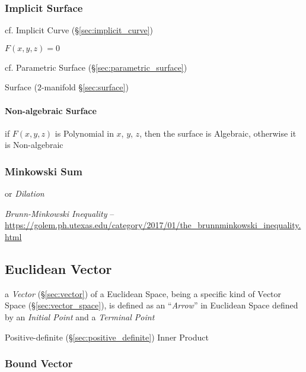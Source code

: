 \subsubsection{Implicit Surface}\label{sec:implicit_surface}

\fist cf. Implicit Curve (\S\ref{sec:implicit_curve})

$F(x,y,z) = 0$

\fist cf. Parametric Surface (\S\ref{sec:parametric_surface})

\fist Surface ($2$-manifold \S\ref{sec:surface})



\paragraph{Non-algebraic Surface}\label{sec:nonalgebraic_surface}\hfill

if $F(x,y,z)$ is Polynomial in $x$, $y$, $z$, then the surface is
Algebraic, otherwise it is Non-algebraic



\subsubsection{Minkowski Sum}\label{sec:minkowski_sum}

or \emph{Dilation}

\emph{Brunn-Minkowski Inequality} --
\url{https://golem.ph.utexas.edu/category/2017/01/the_brunnminkowski_inequality.html}



\subsection{Euclidean Vector}\label{sec:euclidean_vector}

a \emph{Vector} (\S\ref{sec:vector}) of a Euclidean Space, being a specific
kind of Vector Space (\S\ref{sec:vector_space}), is defined as an
``\emph{Arrow}'' in Euclidean Space defined by an \emph{Initial Point} and a
\emph{Terminal Point}

Positive-definite (\S\ref{sec:positive_definite}) Inner Product



\subsubsection{Bound Vector}\label{sec:bound_vector}

